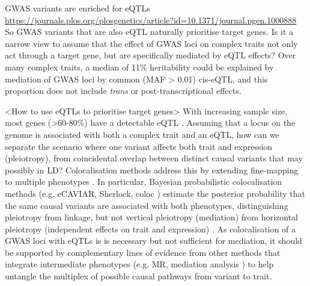 \begin{outline}
\1 GWAS variants are enriched for eQTLs \url{https://journals.plos.org/plosgenetics/article?id=10.1371/journal.pgen.1000888}
    \2 So GWAS variants that are also eQTL naturally prioritise target genes.
    \2 Is it a narrow view to assume that the effect of GWAS loci on complex traits not only act through a target gene, but are specifically mediated by eQTL effects?
        \3 Over many complex traits, a median of 11\% heritability could be explained by mediation of GWAS loci by common (MAF > 0.01) cis-eQTL, 
        and this proportion does not include \textit{trans} or post-transcriptional effects.

\1 <How to use eQTLs to prioritise target genes>
\2 With increasing sample size, most genes (>60-80\%) have a detectable eQTL \autocite{vandiedonck2017GeneticAssociationMolecular,vosa2018UnravelingPolygenicArchitecture}.
Assuming that a locus on the genome is associated with both a complex trait and an \gls{eQTL},
how can we separate the scenario where one variant affects both trait and expression (pleiotropy),
from coincidental overlap between distinct causal variants that may possibly in \gls{LD}?
Colocalisation methods address this by extending fine-mapping to multiple phenotypes \autocite{burgess2018InferringCausalRelationships}.
In particular, Bayesian probabilistic colocalisation methods (e.g. eCAVIAR, Sherlock, coloc \autocite{wallace2020ElicitingPriorsRelaxing}) 
estimate the posterior probability that the same causal variants are associated with both phenotypes,
distinguishing pleiotropy from linkage, 
but not vertical pleiotropy (mediation) from horizontal pleiotropy (independent effects on trait and expression) \autocite{hemani2018EvaluatingPotentialRole}.
As colocalisation of a \gls{GWAS} loci with \glspl{eQTL} is is necessary but not sufficient for mediation, 
it should be supported by complementary lines of evidence from other methods that integrate intermediate phenotypes (e.g. MR, mediation analysis \autocite{hemani2018EvaluatingPotentialRole})
to help untangle the multiplex of possible causal pathways from variant to trait.
%

\end{outline}
